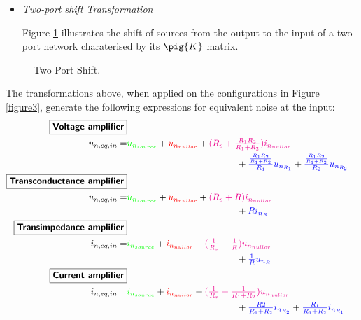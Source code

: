 \documentclass{ecctd01}
\begin{document}
\begin{itemize}
\item {\it Two-port shift Transformation}\par
Figure {\ref{2port}} illustrates the shift of sources from the output
to the input of a two-port network charaterised by its $\pig{K}$
matrix.
\end{itemize} 

\begin{figure}[hbtp]
\vspace{-2mm}
\centerline{
\epsfxsize=78mm
}
\caption{Two-Port Shift.}
\label{2port}
\end{figure} 

The transformations above, when applied on the configurations in Figure
\ref{figure3}, generate the following expressions for equivalent noise
at the input:\vspace{3.0ex}
\large
\begin{eqnarray}
\nonumber
\mbox{\fbox{\bfseries \sffamily Voltage amplifier}} & & \\\nonumber
u_{n,eq,in}= & 
\mbox{\textcolor{green}{$u_{n_{source}}$}} +
\mbox{\textcolor{red}{$u_{n_{nullor}}$}} +
\mbox{\textcolor{magenta}{$(R_s+\frac{R_1R_2}{R_1+R_2})i_{n_{nullor}}$}}
\qquad \qquad \qquad
&
\\\nonumber
&
\qquad \qquad \qquad \qquad \qquad \qquad
+\mbox{\textcolor{blue}{$\frac{\frac{R_1R_2}{R_1+R_2}}{R_1}u_{n_{R_1}}$}}
+\mbox{\textcolor{blue}{$\frac{\frac{R_1R_2}{R_1+R_2}}{R_2}u_{n_{R_2}}$}}
&
\\\label{vnoise}
\mbox{\fbox{\bfseries \sffamily Transconductance amplifier}} &&\\\nonumber
u_{n,eq,in}= &
\mbox{\textcolor{green}{$u_{n_{source}}$}} +
\mbox{\textcolor{red}{$u_{n_{nullor}}$}} +
\mbox{\textcolor{magenta}{$(R_s+R)i_{n_{nullor}}$}}
\qquad \qquad \qquad
&
\\\nonumber
&
\qquad \qquad \qquad \qquad \qquad \qquad
+ \mbox{\textcolor{blue}{$R i_{n_{R}}$}}
&
\\\label{gnoise}
\mbox{\fbox{\bfseries \sffamily Transimpedance amplifier}}\\\nonumber
i_{n,eq,in}= &
\mbox{\textcolor{green}{$i_{n_{source}}$}} +
\mbox{\textcolor{red}{$i_{n_{nullor}}$}} +
\mbox{\textcolor{magenta}{$(\frac{1}{R_s}+\frac{1}{R})u_{n_{nullor}}$}}
\qquad \qquad \qquad
&
\\\nonumber
&
\qquad \qquad \qquad \qquad \qquad \qquad
+ \mbox{\textcolor{blue}{$\frac{1}{R}u_{n_{R}}$}}
&
\\\label{rnoise}
\mbox{\fbox{\bfseries \sffamily Current amplifier}}\\\nonumber
i_{n,eq,in}= &
\mbox{\textcolor{green}{$i_{n_{source}}$}}+
\mbox{\textcolor{red}{$i_{n_{nullor}}$}} +
\mbox{\textcolor{magenta}{$(\frac{1}{R_s}+\frac{1}{R_1+R_2})u_{n_{nullor}}$}}
\qquad \qquad \qquad
&
\\\nonumber
&
\qquad \qquad \qquad \qquad \qquad \qquad
+\mbox{\textcolor{blue}{$\frac{R2}{R_1+R_2}i_{n_{R_2}}$}}
+\mbox{\textcolor{blue}{$\frac{R_1}{R_1+R_2}i_{n_{R_1}}$}}
&
\\\label{inoise}
\end{eqnarray}
\normalsize
\end{document}
